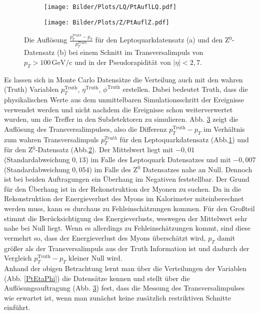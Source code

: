 \begin{figure}
  \begin{subfigure}[t]{0.55\textwidth}
  \texttt{[image: Bilder/Plots/LQ/PtAuflLQ.pdf]}
  \subcaption{}
  \label{PtAuflLQ}
  \end{subfigure}
\begin{subfigure}[t]{0.55\textwidth}
 \texttt{[image: Bilder/Plots/Z/PtAuflZ.pdf]}
  \subcaption{}
  \label{PtAuflZ}
\end{subfigure}
\caption{Die Auflösung $\frac{p_T^{Truth}-p_T}{p_T^{Truth}}$ für den Leptoquarkdatensatz (a) und den Z$^0$-Datensatz (b) bei einem Schnitt im Transversalimpuls von \mbox{$p_T>100\,\text{GeV}/\text{c}$} und in der Pseudorapidität von \mbox{$|\eta|<2,7$}. }
\label{PtAufl}
\end{figure}  
Es lassen sich in Monte Carlo Datensätze die Verteilung auch mit den wahren (Truth) Variablen $p_T^{\text{Truth}}$, $\eta^{\text{Truth}}$, $\phi^{\text{Truth}}$ erstellen. Dabei bedeutet Truth, dass die physikalischen Werte aus dem unmittelbaren Simulationsschritt der Ereignisse verwendet werden und nicht nachdem die Ereignisse schon weiterverwertet wurden, um die Treffer in den Subdetektoren zu simulieren. %
Abb. \ref{PtAufl} zeigt die Auflösung des Transversalimpulses, also die Differenz $p_T^{\text{Truth}}-p_T$ im Verhältnis zum wahren Transversalimpuls $p_T^{Truth}$ für den Leptoquarkdatensatz (Abb.\ref{PtAuflLQ}) und für den Z$^0$-Datensatz (Abb.\ref{PtAuflZ}). Der Mittelwert liegt mit $-0,01$ (Standardabweichung $0,13$) im Falle des Leptoquark Datensatzes und mit $-0,007$ (Standardabweichung $0,054$) im Falle des Z$^0$ Datensatzes nahe an Null. Dennoch ist bei beiden Auftragungen ein Überhang im Negativen feststellbar. %
Der Grund für den Überhang ist in der Rekonstruktion der Myonen zu suchen. Da in die Rekonstruktion der Energieverlust des Myons im Kalorimeter miteinberechnet werden muss, kann es durchaus zu Fehleinschätzungen kommen. Für den Großteil stimmt die Berücksichtigung des Energie\-verlusts, weswegen der Mittelwert sehr nahe bei Null liegt. Wenn es allerdings zu Fehleinschätzungen kommt, sind diese vermehrt so, dass der Energieverlust des Myons überschätzt wird, $p_T$ damit größer als der Transversalimpuls aus der Truth Information ist und dadurch der Vergleich $p_T^{\text{Truth}}-p_T$ kleiner Null wird.\\
Anhand der obigen Betrachtung lernt man über die Verteilungen der Variablen (Abb. \ref{PtEtaPhi}) die Datensätze kennen und stellt über die Auflösungsauftragung (Abb. \ref{PtAufl}) fest, dass die Messung des Transversalimpulses wie erwartet ist, wenn man zunächst keine zusätzlich restriktiven Schnitte einführt. 
%
%
%
